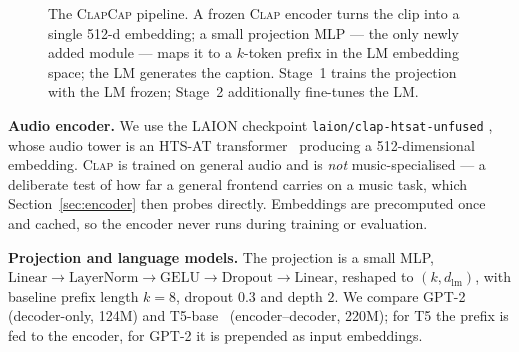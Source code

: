 \documentclass[conference]{IEEEtran}
\newcommand{\clapenc}{\textsc{Clap}}
\newcommand{\sys}{\textsc{ClapCap}}
\begin{document}
\begin{figure}[!t]\centering
\footnotesize
{}
\caption{The \sys{} pipeline. A frozen \clapenc{} encoder turns the clip into a single 512-d
embedding; a small projection MLP --- the only newly added module --- maps it to a $k$-token
prefix in the LM embedding space; the LM generates the caption. Stage~1 trains the projection
with the LM frozen; Stage~2 additionally fine-tunes the LM.}
\label{fig:pipeline}
\end{figure}

\textbf{Audio encoder.} We use the LAION checkpoint \texttt{laion/clap-htsat-unfused}
\cite{wu2023clap}, whose audio tower is an HTS-AT transformer~\cite{chen2022htsat} producing a
512-dimensional embedding. \clapenc{} is trained on general audio and is \emph{not}
music-specialised --- a deliberate test of how far a general frontend carries on a music task,
which Section~\ref{sec:encoder} then probes directly. Embeddings are precomputed once and
cached, so the encoder never runs during training or evaluation.

\textbf{Projection and language models.} The projection is a small MLP,
$\text{Linear}\!\rightarrow\!\text{LayerNorm}\!\rightarrow\!\text{GELU}\!\rightarrow\!
\text{Dropout}\!\rightarrow\!\text{Linear}$, reshaped to $(k,d_{\text{lm}})$, with baseline
prefix length $k{=}8$, dropout $0.3$ and depth $2$. We compare
GPT-2~\cite{radford2019gpt2} (decoder-only, 124M) and T5-base~\cite{raffel2020t5}
(encoder--decoder, 220M); for T5 the prefix is fed to the encoder, for GPT-2 it is prepended as
input embeddings.
\end{document}
